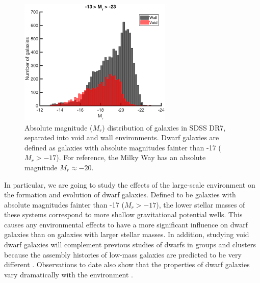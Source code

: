 \begin{figure}
    \includegraphics[width=0.65\textwidth]{Images/Intro/1sig_13-23_SDSS_Mr_hist_count_fill}
    \caption[Absolute magnitude distribution of galaxies in SDSS DR7]{Absolute 
    magnitude ($M_r$) distribution of galaxies in SDSS DR7, separated into void 
    and wall environments.  Dwarf galaxies are defined as galaxies with absolute 
    magnitudes fainter than -17 ($M_r > -17$).  For reference, the Milky Way has 
    an absolute magnitude $M_r \approx -20$.}
\end{figure}

In particular, we are going to study the effects of the large-scale environment 
on the formation and evolution of dwarf galaxies.  Defined to be galaxies with 
absolute magnitudes fainter than -17 ($M_r > -17$), the lower stellar masses of 
these systems correspond to more shallow gravitational potential wells.  This 
causes any environmental effects to have a more significant influence on dwarf 
galaxies than on galaxies with larger stellar masses.  In addition, studying 
void dwarf galaxies will complement previous studies of dwarfs in groups and 
clusters because the assembly histories of low-mass galaxies are predicted to 
be very different \citep[e.g.,][]{Gao07,Lackner12}.  Observations to date also 
show that the properties of dwarf galaxies vary dramatically with the 
environment \citep[e.g.,][]{Ann08,Geha12}.




